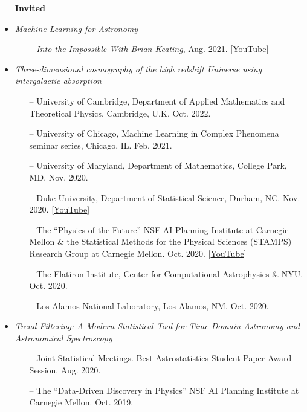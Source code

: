 \documentclass[letterpaper,10pt]{article}
\begin{document}
\begin{itemize}[itemsep=0.3cm, leftmargin=0.6cm]
\item[] \hspace{-5ex} {\bf \fontsize{10}{48} \selectfont Invited} 
\vspace{-0.05cm}

\item {\it Machine Learning for Astronomy}
\begin{itemize}[leftmargin=0.55cm, itemsep=0.1cm]
\item[--] {\it Into the Impossible With Brian Keating}, Aug. 2021. [\href{https://www.youtube.com/watch?v=jpD_4S7Wi3E&t=2123s}{YouTube}]
\end{itemize}

\item {\it Three-dimensional cosmography of the high redshift Universe using intergalactic absorption}
\begin{itemize}[leftmargin=0.55cm, itemsep=0.1cm]
\item[--] University of Cambridge, Department of Applied Mathematics and Theoretical Physics, Cambridge, U.K. Oct. 2022.
\item[--] University of Chicago, Machine Learning in Complex Phenomena seminar series, Chicago, IL. Feb. 2021.
\item[--] University of Maryland, Department of Mathematics, College Park, MD. Nov. 2020.
\item[--] Duke University, Department of Statistical Science, Durham, NC. Nov. 2020. [\href{https://youtu.be/Yi0z688goqs}{YouTube}]
\item[--] The ``Physics of the Future'' NSF AI Planning Institute at Carnegie Mellon \& the Statistical Methods for the Physical Sciences (STAMPS) Research Group at Carnegie Mellon. Oct. 2020. [\href{https://youtu.be/89vjQxVIDpI}{YouTube}]
\item[--] The Flatiron Institute, Center for Computational Astrophysics \& NYU. Oct. 2020.
\item[--] Los Alamos National Laboratory, Los Alamos, NM. Oct. 2020. 
\end{itemize}

\item {\it Trend Filtering: A Modern Statistical Tool for Time-Domain Astronomy and Astronomical Spectroscopy}
\begin{itemize}[leftmargin=0.55cm, itemsep=0.1cm]
\item[--] Joint Statistical Meetings. Best Astrostatistics Student Paper Award Session. Aug. 2020.
\item[--] The ``Data-Driven Discovery in Physics'' NSF AI Planning Institute at Carnegie Mellon. Oct. 2019.
\end{itemize}


\end{itemize}
\end{document}
